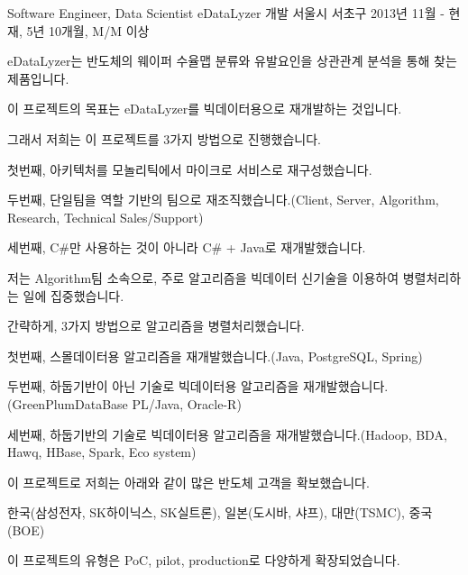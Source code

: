 

\begin{cventries}

  \cventry
    {Software Engineer, Data Scientist} %
    {eDataLyzer 개발} %
    {서울시 서초구} %
    {2013년 11월 - 현재, 5년 10개월, M/M 이상} %
    {
      \begin{cvitems} %
        \item {eDataLyzer는 반도체의 웨이퍼 수율맵 분류와 유발요인을 상관관계 분석을 통해 찾는 제품입니다.}
        \item {이 프로젝트의 목표는 eDataLyzer를 빅데이터용으로 재개발하는 것입니다.}
        \item {그래서 저희는 이 프로젝트를 3가지 방법으로 진행했습니다.}
        \item {첫번째, 아키텍처를 모놀리틱에서 마이크로 서비스로 재구성했습니다.}
        \item {두번째, 단일팀을 역할 기반의 팀으로 재조직했습니다.(Client, Server, Algorithm, Research, Technical Sales/Support)}
        \item {세번째, C\#만 사용하는 것이 아니라 C\# + Java로 재개발했습니다.}
        \item {저는 Algorithm팀 소속으로, 주로 알고리즘을 빅데이터 신기술을 이용하여 병렬처리하는 일에 집중했습니다.}
        \item {간략하게, 3가지 방법으로 알고리즘을 병렬처리했습니다.}
        \item {첫번째, 스몰데이터용 알고리즘을 재개발했습니다.(Java, PostgreSQL, Spring)}
        \item {두번째, 하둡기반이 아닌 기술로 빅데이터용 알고리즘을 재개발했습니다.(GreenPlumDataBase PL/Java, Oracle-R)}
        \item {세번째, 하둡기반의 기술로 빅데이터용 알고리즘을 재개발했습니다.(Hadoop, BDA, Hawq, HBase, Spark, Eco system)}
        \item {이 프로젝트로 저희는 아래와 같이 많은 반도체 고객을 확보했습니다.}
        \item {한국(삼성전자, SK하이닉스, SK실트론), 일본(도시바, 샤프), 대만(TSMC), 중국(BOE)}
        \item {이 프로젝트의 유형은 PoC, pilot, production로 다양하게 확장되었습니다.}
      \end{cvitems}
    }


\end{cventries}
